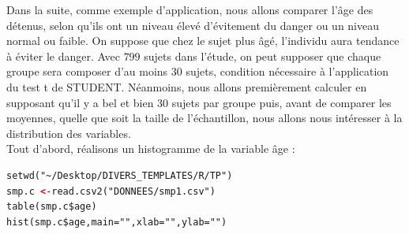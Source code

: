 \begin{center}
\end{center}
Dans la suite, comme exemple d'application, nous allons comparer l'âge des détenus, selon qu'ils ont un niveau élevé d'évitement du danger ou un niveau normal ou faible. On suppose que chez le sujet plus âgé, l'individu aura tendance à éviter le danger.\newline
Avec $799$ sujets dans l'étude, on peut supposer que chaque groupe sera composer d'au moins $30$ sujets, condition nécessaire à l'application du test t de STUDENT. Néanmoins, nous allons premièrement calculer en supposant qu'il y a bel et bien 30 sujets par groupe puis, avant de comparer les moyennes, quelle que soit la taille de l'échantillon, nous allons nous intéresser à la distribution des variables.\newline
\\
Tout d'abord, réalisons un histogramme de la variable âge : 
\begin{lstlisting}[language=html]
setwd("~/Desktop/DIVERS_TEMPLATES/R/TP")
smp.c <-read.csv2("DONNEES/smp1.csv")
table(smp.c$age)
hist(smp.c$age,main="",xlab="",ylab="")
\end{lstlisting}

